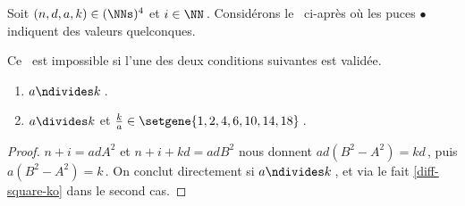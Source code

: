 \begin{fact} \label{sftable-illegal-0-sol}
	Soit $(n, d, a, k) \in ( \NNs )^4$ et $i \in \NN$\,.
	Considérons le \sftab\ ci-après où les puces $\bullet$ indiquent des valeurs quelconques.

    \begin{center}
    \end{center}

	Ce \sftab\ est impossible si l'une des deux conditions suivantes est validée.

	\begin{enumerate}[start=2]
		\item $a \ndivides k$\,.

		\item $a \divides k$ et $\frac{k}{a} \in \setgene{1, 2, 4, 6, 10, 14, 18}$\,.
	\end{enumerate}
\end{fact}


\begin{proof}
	$n + i = ad A^2$ et $n + i + k d = ad B^2$ nous donnent $ad (B^2 - A^2) = k d$\,, puis $a (B^2 - A^2) = k$\,. On conclut directement si $a \ndivides k$\,, et via le fait \ref{diff-square-ko} dans le second cas.
\end{proof}

